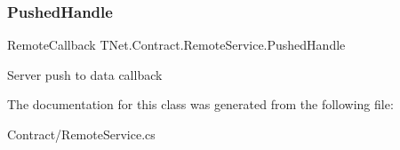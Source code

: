 \mbox{\label{class_t_net_1_1_contract_1_1_remote_service_a359541f7a12b4829d9b5f0689326d9b8}} 
\subsubsection{\texorpdfstring{Pushed\+Handle}{PushedHandle}}
{\footnotesize\ttfamily Remote\+Callback T\+Net.\+Contract.\+Remote\+Service.\+Pushed\+Handle}



Server push to data callback 



The documentation for this class was generated from the following file\+:\begin{DoxyCompactItemize}
\item 
Contract/Remote\+Service.\+cs\end{DoxyCompactItemize}
